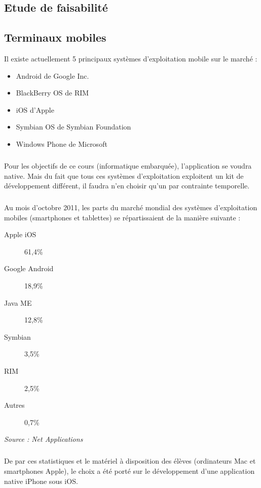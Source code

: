\documentclass[a4paper,12pt]{report}
\begin{document}
\begin{onehalfspace}
	\chapter{Etude de faisabilité}
	
	\section{Terminaux mobiles}
	
	Il existe actuellement 5 principaux systèmes d'exploitation mobile sur le marché :
	\begin{itemize}
		\item Android de Google Inc.
		\item BlackBerry OS de RIM
		\item iOS d'Apple
		\item Symbian OS de Symbian Foundation
		\item Windows Phone de Microsoft
	\end{itemize}
	
	\paragraph*{}
	Pour les objectifs de ce cours (informatique embarquée), l'application se voudra native. Mais du fait que tous ces systèmes d'exploitation exploitent un kit de développement différent, il faudra n'en choisir qu'un par contrainte temporelle.
	
	\paragraph*{}
	Au mois d'octobre 2011, les parts du marché mondial des systèmes d'exploitation mobiles (smartphones et tablettes) se répartissaient de la manière suivante :
	\begin{description}
		\item[Apple iOS] 61,4\%
		\item[Google Android] 18,9\%
		\item[Java ME] 12,8\%
		\item[Symbian] 3,5\%
		\item[RIM] 2,5\%
		\item[Autres] 0,7\%
	\end{description}
	\emph{Source : Net Applications}
	
	\paragraph*{}
	De par ces statistiques et le matériel à disposition des élèves (ordinateurs Mac et smartphones Apple), le choix a été porté sur le développement d'une application native iPhone sous iOS.
	

\end{onehalfspace}
\end{document}
